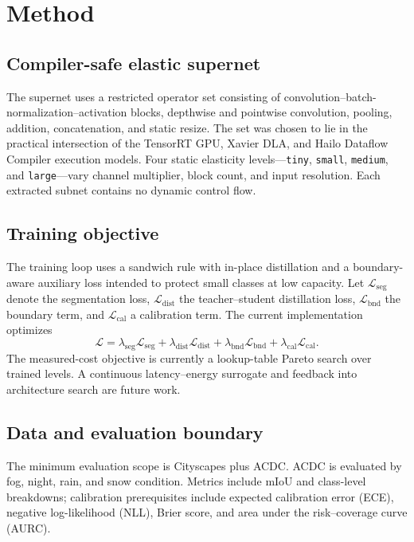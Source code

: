 \section{Method}
\label{sec:method}

\subsection{Compiler-safe elastic supernet}
The supernet uses a restricted operator set consisting of convolution--batch-normalization--activation blocks, depthwise and pointwise convolution, pooling, addition, concatenation, and static resize. The set was chosen to lie in the practical intersection of the TensorRT GPU, Xavier DLA, and Hailo Dataflow Compiler execution models. Four static elasticity levels---\texttt{tiny}, \texttt{small}, \texttt{medium}, and \texttt{large}---vary channel multiplier, block count, and input resolution. Each extracted subnet contains no dynamic control flow.

\subsection{Training objective}
The training loop uses a sandwich rule with in-place distillation and a boundary-aware auxiliary loss intended to protect small classes at low capacity. Let $\mathcal{L}_{\mathrm{seg}}$ denote the segmentation loss, $\mathcal{L}_{\mathrm{dist}}$ the teacher--student distillation loss, $\mathcal{L}_{\mathrm{bnd}}$ the boundary term, and $\mathcal{L}_{\mathrm{cal}}$ a calibration term. The current implementation optimizes
\begin{equation}
  \mathcal{L}=\lambda_{\mathrm{seg}}\mathcal{L}_{\mathrm{seg}}+\lambda_{\mathrm{dist}}\mathcal{L}_{\mathrm{dist}}+\lambda_{\mathrm{bnd}}\mathcal{L}_{\mathrm{bnd}}+\lambda_{\mathrm{cal}}\mathcal{L}_{\mathrm{cal}}.
\end{equation}
The measured-cost objective is currently a lookup-table Pareto search over trained levels. A continuous latency--energy surrogate and feedback into architecture search are future work.

\subsection{Data and evaluation boundary}
The minimum evaluation scope is Cityscapes plus ACDC. ACDC is evaluated by fog, night, rain, and snow condition. Metrics include mIoU and class-level breakdowns; calibration prerequisites include expected calibration error (ECE), negative log-likelihood (NLL), Brier score, and area under the risk--coverage curve (AURC).

